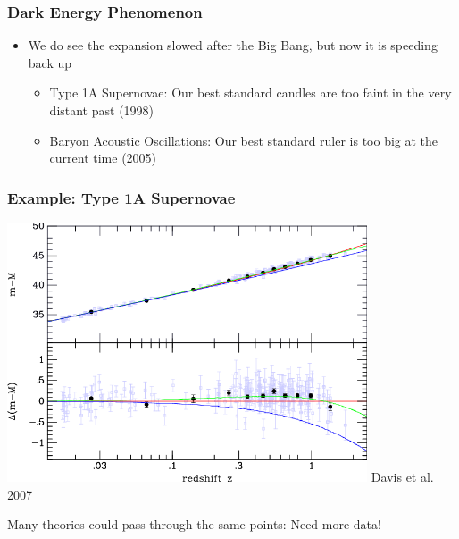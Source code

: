 \documentclass{beamer}
\begin{document}
\frame
{
    \frametitle{Dark Energy Phenomenon}

 
    \begin{itemize}

        \item We do see the expansion slowed after the Big Bang, but now it is
            speeding back up

        \begin{itemize}
            \item Type 1A Supernovae: Our best standard candles are too faint in the very distant past (1998)
            \item Baryon Acoustic Oscillations: Our best standard ruler is too big at the current time (2005)
        \end{itemize}

    \end{itemize}

}


\frame
{
    \frametitle{Example: Type 1A Supernovae}

 
    \begin{center}
        \includegraphics[width=0.8\textwidth]{davis_hub.png}
        \newline
        {\tiny Davis et al. 2007}
    \end{center}
    
    \begin{center}
        Many theories could pass through the same points: 
        \newline
        {\color{gold} Need more data!}
    \end{center}
}
\end{document}
